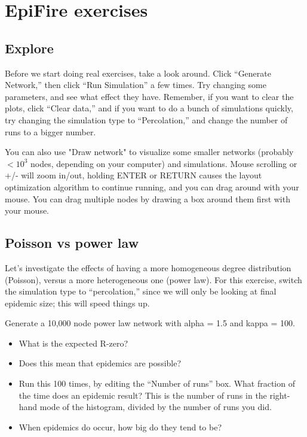\documentclass{article}
\begin{document}
\section{EpiFire exercises}

\subsection{Explore}
Before we start doing real exercises, take a look around.  Click ``Generate Network,'' then click ``Run Simulation'' a few times.  Try changing some parameters, and see what effect they have.  Remember, if you want to clear the plots, click ``Clear data,'' and if you want to do a bunch of simulations quickly, try changing the simulation type to ``Percolation,'' and change the number of runs to a bigger number.

You can also use "Draw network" to visualize some smaller networks (probably $<10^3$ nodes, depending on your computer) and simulations.  Mouse scrolling or +/- will zoom in/out, holding ENTER or RETURN causes the layout optimization algorithm to continue running, and you can drag around with your mouse.  You can drag multiple nodes by drawing a box around them first with your mouse.

\subsection{Poisson vs power law}
Let's investigate the effects of having a more homogeneous degree distribution (Poisson), versus a more heterogeneous one (power law).  For this exercise, switch the simulation type to ``percolation,'' since we will only be looking at final epidemic size; this will speed things up.

Generate a 10,000 node power law network with alpha = 1.5 and kappa = 100.  
\begin{itemize}
 \item What is the expected R-zero?

 \item Does this mean that epidemics are possible?

 \item Run this 100 times, by editing the ``Number of runs'' box.  What fraction of the time does an epidemic result?  This is the number of runs in the right-hand mode of the histogram, divided by the number of runs you did.

 \item When epidemics do occur, how big do they tend to be?
\end{itemize}
\end{document}
